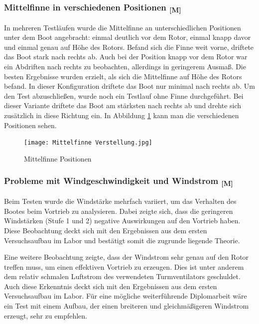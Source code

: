 \documentclass[a4paper,12pt]{article}
\begin{document}
\subsubsection{\texorpdfstring{Mittelfinne in verschiedenen Positionen \textsubscript{[M]}}{Mittelfinne in verschiedenen Positionen [M]}}

In mehreren Testläufen wurde die Mittelfinne an unterschiedlichen Positionen unter dem Boot angebracht: einmal deutlich vor dem Rotor, einmal knapp davor und einmal genau auf Höhe des Rotors. Befand sich die Finne weit vorne, driftete das Boot stark nach rechts ab. Auch bei der Position knapp vor dem Rotor war ein Abdriften nach rechts zu beobachten, allerdings in geringerem Ausmaß. Die besten Ergebnisse wurden erzielt, als sich die Mittelfinne auf Höhe des Rotors befand. In dieser Konfiguration driftete das Boot nur minimal nach rechts ab. Um den Test abzuschließen, wurde noch ein Testlauf ohne Finne durchgeführt. Bei dieser Variante driftete das Boot am stärksten nach rechts ab und drehte sich zusätzlich in diese Richtung ein. In Abbildung \ref{fig:Mittelfinne Positionen} kann man die verschiedenen Positionen sehen.

\begin{figure}[H]
    \centering
    \texttt{[image: Mittelfinne Verstellung.jpg]}
    \caption{Mittelfinne Positionen}
    \label{fig:Mittelfinne Positionen}
\end{figure}

\newpage

\subsubsection{\texorpdfstring{Probleme mit Windgeschwindigkeit und Windstrom \textsubscript{[M]}}{Probleme mit Windgeschwindigkeit und Windstrom [M]}}


Beim Testen wurde die Windstärke mehrfach variiert, um das Verhalten des Bootes beim Vortrieb zu analysieren. Dabei zeigte sich, dass die geringeren Windstärken (Stufe 1 und 2) negative Auswirkungen auf den Vortrieb haben. Diese Beobachtung deckt sich mit den Ergebnissen aus dem ersten Versuchsaufbau im Labor und bestätigt somit die zugrunde liegende Theorie.\newline

Eine weitere Beobachtung zeigte, dass der Windstrom sehr genau auf den Rotor treffen muss, um einen effektiven Vortrieb zu erzeugen. Dies ist unter anderem dem relativ schmalen Luftstrom des verwendeten Turmventilators geschuldet. Auch diese Erkenntnis deckt sich mit den Ergebnissen aus dem ersten Versuchsaufbau im Labor. Für eine mögliche weiterführende Diplomarbeit wäre ein Test mit einem Aufbau, der einen breiteren und gleichmäßigeren Windstrom erzeugt, sehr zu empfehlen.
\end{document}
